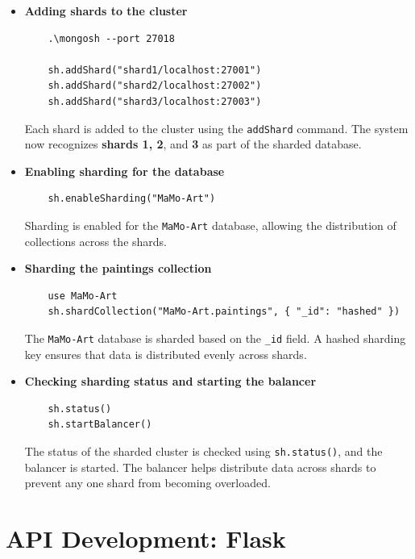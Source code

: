 \documentclass[a4paper,12pt]{article}
\begin{document}
\begin{itemize}
    \item \textbf{Adding shards to the cluster}

          \begin{lstlisting}
    .\mongosh --port 27018

    sh.addShard("shard1/localhost:27001")
    sh.addShard("shard2/localhost:27002")
    sh.addShard("shard3/localhost:27003")
    \end{lstlisting}

          Each shard is added to the cluster using the \texttt{addShard} command. The system now recognizes \textbf{shards 1, 2}, and \textbf{3} as part of the sharded database.

    \item \textbf{Enabling sharding for the database}

          \begin{lstlisting}
    sh.enableSharding("MaMo-Art")
    \end{lstlisting}

          Sharding is enabled for the \texttt{MaMo-Art} database, allowing the distribution of collections across the shards.

    \item \textbf{Sharding the paintings collection}

          \begin{lstlisting}
    use MaMo-Art
    sh.shardCollection("MaMo-Art.paintings", { "_id": "hashed" })
    \end{lstlisting}

          The \texttt{MaMo-Art} database is sharded based on the \texttt{\_id} field. A hashed sharding key ensures that data is distributed evenly across shards.

    \item \textbf{Checking sharding status and starting the balancer}

          \begin{lstlisting}
    sh.status()
    sh.startBalancer()
    \end{lstlisting}

          The status of the sharded cluster is checked using \texttt{sh.status()}, and the balancer is started. The balancer helps distribute data across shards to prevent any one shard from becoming overloaded.
\end{itemize}

\newpage
\section{API Development: Flask}
\justify
\end{document}
